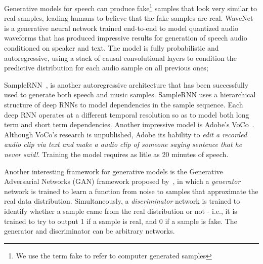 Generative models for speech can produce fake\footnote{We use the term fake to refer to
computer generated samples} samples that look very similar to real samples,
leading humans to believe that the fake samples are real.
WaveNet~\cite{van2016wavenet} is a generative neural network trained end-to-end
to model quantized audio waveforms that has produced impressive results for
generation of speech audio conditioned on speaker and text. The model is fully
probabilistic and autoregressive, using a stack of causal convolutional layers
to condition the predictive distribution for each audio sample on all previous ones; 

SampleRNN~\cite{mehri2016samplernn}, is another autoregressive architecture that
has been successfully used to generate both speech and music samples. SampleRNN
uses a hierarchical structure of deep RNNs to model dependencies in the sample
sequence. Each deep RNN operates at a different temporal resolution so as to
model both long term and short term dependencies. Another impressive model is
Adobe's VoCo~\cite{adobe2017voco}. Although VoCo's research is unpublished,
Adobe its hability to \textit{edit a recorded audio clip via text and make
a audio clip of someone saying sentence that he never said!}. Training the model
requires as litle as 20 minutes of speech.

Another interesting framework for generative models is the Generative Adversarial
Networks (GAN) framework proposed by~\cite{goodfellow2014generative}, in which a
\textit{generator} network is trained to learn a function from noise to samples
that approximate the real data distribution. Simultaneously, a
\textit{discriminator} network is trained to identify whether a sample came from
the real distribution or not - i.e., it is trained to try to output 1 if a sample is real, and 0 if a sample is fake. The generator and discriminator can be arbitrary networks.

